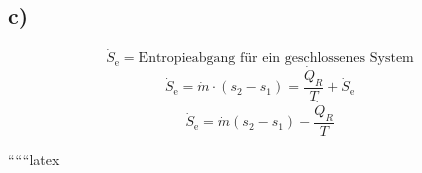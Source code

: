 

\subsection*{c)}
\[
\dot{S}_{\text{e}} = \text{Entropieabgang für ein geschlossenes System}
\]
\[
\dot{S}_{\text{e}} = \dot{m} \cdot (s_2 - s_1) = \frac{\dot{Q}_R}{T} + \dot{S}_{\text{e}}
\]
\[
\dot{S}_{\text{e}} = \dot{m} (s_2 - s_1) - \frac{\dot{Q}_R}{T}
\]

``````latex